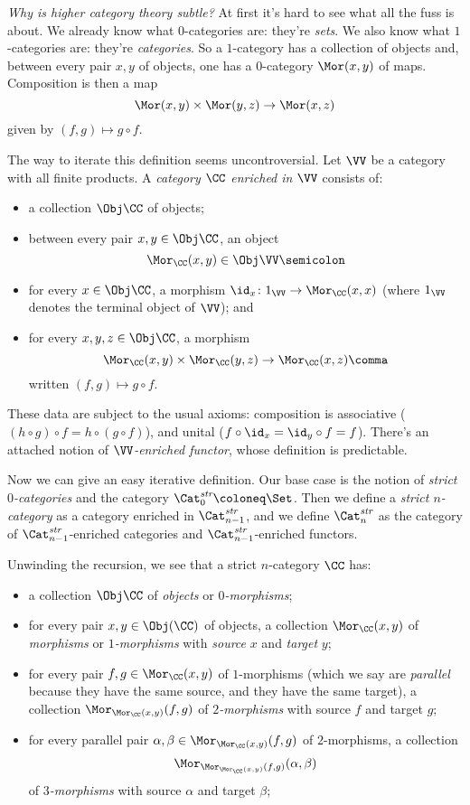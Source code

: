 \emph{Why is higher category theory subtle?}
At first it's hard to see what all the fuss is about.
We already know what $0$-categories are: they're \emph{sets}.
We also know what $1$-categories are: they're \emph{categories}.
So a $1$-category has a collection of objects and, between every pair $x,y$ of objects, one has a $0$-category $\Mor(x,y)$ of maps.
Composition is then a map
\[
  \Mor(x,y) \times \Mor(y,z) \to \Mor(x,z)
\]
given by $(f,g) \mapsto g \circ f$.

The way to iterate this definition seems uncontroversial.
Let $\VV$ be a category with all finite products.
A \emph{category $\CC$ enriched in $\VV$} consists of:
\begin{itemize}
  \item a collection $\Obj \CC$ of objects;
  \item between every pair $x,y \in \Obj \CC$, an object
  \[
    \Mor_{\CC}(x,y) \in \Obj \VV \semicolon
  \]
  \item for every $x \in \Obj \CC$, a morphism $\id_x \colon 1_{\VV} \to \Mor_{\CC}(x,x)$ (where $1_{\VV}$ denotes the terminal object of $\VV$); and
  \item for every $x,y,z \in \Obj \CC$, a morphism
    \[
      \Mor_{\CC}(x,y) \times \Mor_{\CC}(y,z) \to \Mor_{\CC}(x,z) \comma
    \]
    written $(f,g) \mapsto g \circ f$.
\end{itemize}
These data are subject to the usual axioms: composition is associative ($(h \circ g) \circ f = h \circ (g \circ f)$), and unital ($f \circ \id_x = \id_y \circ f = f$).
There's an attached notion of \emph{$\VV$-enriched functor}, whose definition is predictable.

Now we can give an easy iterative definition.
Our base case is the notion of \emph{strict $0$-categories} and the category $\Cat^{\textit{str}}_0 \coloneq \Set$.
Then we define a \emph{strict $n$-category} as a category enriched in $\Cat^{\textit{str}}_{n-1}$,
and we define $\Cat^{\textit{str}}_n$ as the category of $\Cat^{\textit{str}}_{n-1}$-enriched categories and $\Cat^{\textit{str}}_{n-1}$-enriched functors.

Unwinding the recursion, we see that a strict $n$-category $\CC$ has:
\begin{itemize}
  \item a collection $\Obj \CC$ of \emph{objects} or \emph{$0$-morphisms};
  \item for every pair $x,y \in \Obj(\CC)$ of objects, a collection $\Mor_{\CC}(x,y)$ of \emph{morphisms} or \emph{$1$-morphisms} with \emph{source} $x$ and \emph{target} $y$;
  \item for every pair $f,g \in \Mor_{\CC}(x,y)$ of $1$-morphisms (which we say are \emph{parallel} because they have the same source, and they have the same target), a collection $\Mor_{\Mor_{\CC}(x,y)}(f,g)$ of \emph{$2$-morphisms} with source $f$ and target $g$;
  \item for every parallel pair $\alpha,\beta \in \Mor_{\Mor_{\CC}(x,y)}(f,g)$ of $2$-morphisms, a collection
    \[
      \Mor_{\Mor_{\Mor_{\CC}(x,y)}(f,g)}(\alpha,\beta)
    \]
    of \emph{$3$-morphisms} with source $\alpha$ and target $\beta$;
\end{itemize}

